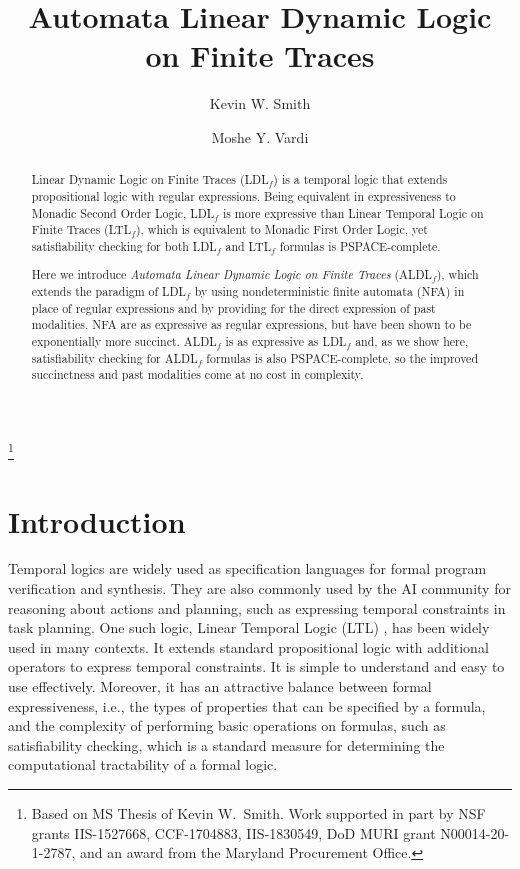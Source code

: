 \documentclass{lmcs}
\theoremstyle{definition}
\DeclareMathOperator{\?}{?}
\begin{document}
\title{Automata Linear Dynamic Logic on Finite Traces}

\author{Kevin W. Smith}
\address{Computer Science Department, Rice University}
\thanks{Based on MS Thesis of Kevin W.~Smith. Work supported in part by NSF grants IIS-1527668, CCF-1704883, IIS-1830549, DoD MURI grant N00014-20-1-2787, and an award from the Maryland Procurement Office.}


\author{Moshe Y. Vardi}
\address{Computer Science Department, Rice University}


\begin{abstract}

  Linear Dynamic Logic on Finite Traces (LDL$_f$) is a temporal logic that extends propositional logic with regular expressions. Being equivalent in expressiveness to Monadic Second Order Logic, LDL$_f$ is more expressive than Linear Temporal Logic on Finite Traces (LTL$_f$), which is equivalent to Monadic First Order Logic, yet satisfiability checking for both LDL$_f$ and LTL$_f$ formulas is PSPACE-complete.

  Here we introduce \textit{Automata Linear Dynamic Logic on Finite Traces} (ALDL$_f$), which extends the paradigm of LDL$_f$ by using nondeterministic finite automata (NFA) in place of regular expressions and by providing for the direct expression of past modalities. NFA are as expressive as regular expressions, but have been shown to be exponentially more succinct. ALDL$_f$ is as expressive as LDL$_f$ and, as we show here,  satisfiability checking for ALDL$_f$ formulas is also PSPACE-complete, so the improved succinctness and past modalities come at no cost in complexity.
\end{abstract}

\maketitle



\section{Introduction}
\label{ch:introduction}

Temporal logics are widely used as specification languages for formal program verification and synthesis. They are also commonly used by the AI community for reasoning about actions and planning, such as expressing temporal constraints in task planning. One such logic, Linear Temporal Logic (LTL) \cite{pnueli77}, has been widely used in many contexts. It extends standard propositional logic with additional operators to express temporal constraints. It is simple to understand and easy to use effectively. Moreover, it has an attractive balance between formal expressiveness, i.e., the types of properties that can be specified by a formula, and the complexity of performing basic operations on formulas, such as satisfiability checking, which is a standard measure for determining the computational tractability of a formal logic.
\end{document}
